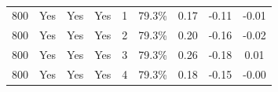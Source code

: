 \documentclass[]{marticle}
\begin{document}
\begin{table}[!tb]
\begin{center}
\begin{tabular}{  ccccccccc  }
800 & Yes & Yes & Yes &  1 & 79.3\% & 0.17 & -0.11 & -0.01  \\
800 & Yes & Yes & Yes &  2 & 79.3\% & 0.20 & -0.16 & -0.02  \\
800 & Yes & Yes & Yes &  3 & 79.3\% & 0.26 & -0.18 & 0.01  \\
800 & Yes & Yes & Yes &  4 & 79.3\% & 0.18 & -0.15 & -0.00  \\
    \hline
\end{tabular}
\caption{
}
\end{center}
\end{table}

\newpage
\clearpage
{}
{}

\end{document}
